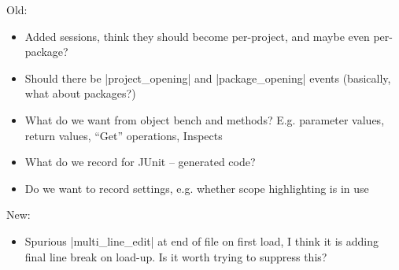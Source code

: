 \documentclass{book}
\begin{document}
Old:
\begin{itemize}
\item Added sessions, think they should become per-project, and maybe even per-package?
\item Should there be |project_opening| and |package_opening| events
  (basically, what about packages?)
\item What do we want from object bench and methods?  E.g. parameter values,
  return values, ``Get'' operations, Inspects
\item What do we record for JUnit -- generated code?
\item Do we want to record settings, e.g. whether scope highlighting is in
  use
\end{itemize}

New:
\begin{itemize}
\item Spurious |multi_line_edit| at end of file on first load, I think it is adding final
  line break on load-up.  Is it worth trying to suppress this?
\end{itemize}
\end{document}
